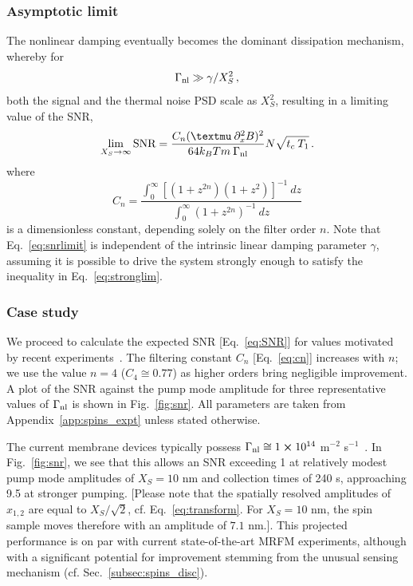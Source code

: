 \subsubsection{Asymptotic limit} 
The nonlinear damping eventually becomes the dominant dissipation mechanism, whereby for
\begin{equation} \label{eq:stronglim}
\Gamma_{\rm nl} \gg \gamma / X_S^2 \,,
\end{equation}
both the signal and the thermal noise PSD scale as $X_S^2$, resulting in a limiting value of the SNR,
\begin{equation} \label{eq:snrlimit}
\lim_{X_S\rightarrow \infty}{\text{SNR}} =\frac{ C_n (\mu\: \partial_x^2 B)^2}{64 k_B T m \:\Gamma_{\rm nl} } N \sqrt{t_c \: T_1} \,.
\end{equation}
where
\begin{equation} \label{eq:cn}
C_n = \frac{\int_{0}^{\infty} [ (1 + z^{2n}) (1 + z^2)]^{-1} \: dz}{\int_{0}^{\infty} (1 + z^{2n})^{-1} \:dz}
\end{equation}
is a dimensionless constant, depending solely on the filter order $n$. Note that Eq.~\eqref{eq:snrlimit} is independent of the intrinsic linear damping parameter $\gamma$, assuming it is possible to drive the system strongly enough to satisfy the inequality in Eq.~\eqref{eq:stronglim}.

\subsubsection{Case study} 
We proceed to calculate the expected SNR [Eq.~\eqref{eq:SNR}] for values motivated by recent experiments~\cite{Rossi_2018}. The filtering constant $C_n$ [Eq.~\eqref{eq:cn}] increases with $n$; we use the value $n=4$ ($C_4 \cong 0.77$) as higher orders bring negligible improvement. A plot of the SNR against the pump mode amplitude for three representative values of $\Gamma_{\rm nl}$ is shown in Fig.~\ref{fig:snr}. All parameters are taken from Appendix~\ref{app:spins_expt} unless stated otherwise.

The current membrane devices typically possess $\Gamma_{\rm nl} \cong 1\cross10^{14}$ m$^{-2}$ s$^{-1}$~\cite{Catalini_2020}. In Fig.~\ref{fig:snr}, we see that this allows an SNR exceeding 1 at relatively modest pump mode amplitudes of $X_S = 10$ nm and collection times of 240 s, approaching 9.5 at stronger pumping. [Please note that the spatially resolved amplitudes of $x_{1,2}$ are equal to $X_S/\sqrt{2}$, cf. Eq.~\eqref{eq:transform}. For $X_S = 10$ nm, the spin sample moves therefore with an amplitude of $7.1$ nm.]. This projected performance is on par with current state-of-the-art MRFM experiments, although with a significant potential for improvement stemming from the unusual sensing mechanism (cf. Sec.~\ref{subsec:spins_disc}).

